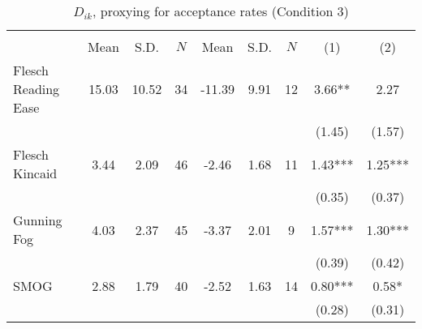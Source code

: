 \begin{table}[H]
    \footnotesize
    \centering
    \begin{threeparttable}
        \caption{\(D_{ik}\), proxying for acceptance rates (Condition 3)}
        \label{tableC16}
        \begin{tabular}{p{3cm}S[table-format=3.3]@{}S[table-format=3.3]@{}S[table-format=3.2]@{}S[table-format=4.3]@{}S[table-format=3.3]@{}S[table-format=3.1]@{}S@{}S@{}}
            \toprule
            &&&\\\cmidrule(lr){2-4}\cmidrule(lr){5-7}\cmidrule(lr){8-9}&{{Mean}}&{{S.D.}}&{{\(N\)}}&{{Mean}}&{{S.D.}}&{{\(N\)}}&{{(1)}}&{{(2)}}\\
            \midrule
            Flesch Reading Ease           &       15.03&       10.52&          34&      -11.39&        9.91&          12&        3.66** &        2.27   \\
                                          &            &            &            &            &            &            &      (1.45)   &      (1.57)   \\
            Flesch Kincaid                &        3.44&        2.09&          46&       -2.46&        1.68&          11&        1.43***&        1.25***\\
                                          &            &            &            &            &            &            &      (0.35)   &      (0.37)   \\
            Gunning Fog                   &        4.03&        2.37&          45&       -3.37&        2.01&           9&        1.57***&        1.30***\\
                                          &            &            &            &            &            &            &      (0.39)   &      (0.42)   \\
            SMOG                          &        2.88&        1.79&          40&       -2.52&        1.63&          14&        0.80***&        0.58*  \\
                                          &            &            &            &            &            &            &      (0.28)   &      (0.31)   \\

\end{tabular}
\end{threeparttable}
\end{table}
